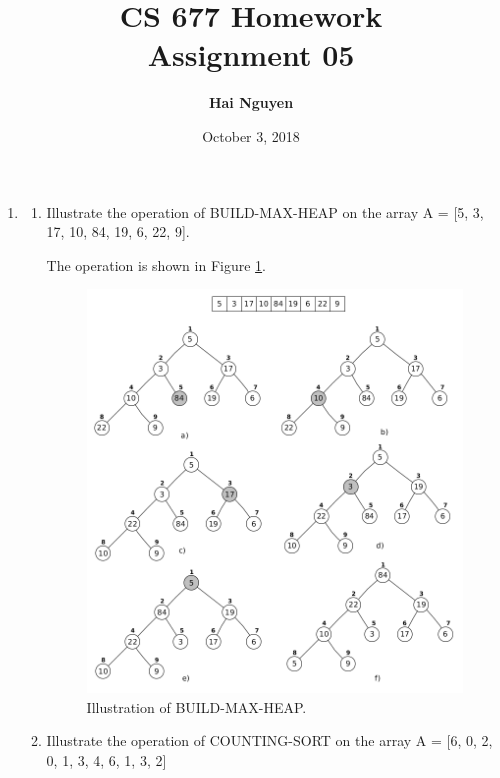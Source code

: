 \documentclass[11pts]{report}
\title{CS 677 Homework \\ Assignment 05}
\date{October 3, 2018}
\author{\textbf{Hai Nguyen}}
\begin{document}
\maketitle

\begin{enumerate}

\item 
\begin{enumerate}
\item Illustrate the operation of BUILD-MAX-HEAP on the array A = [5, 3, 17, 10, 84, 19, 6, 22, 9].

The operation is shown in Figure \ref{Fig:1a}.

\begin{figure}[htbp]
\begin{center}
\includegraphics[scale=0.5]{1a.png}
\caption{Illustration of BUILD-MAX-HEAP.}
\label{Fig:1a}
\end{center}
\end{figure}


\item Illustrate the operation of COUNTING-SORT on the array A = [6, 0, 2, 0, 1, 3, 4, 6, 1, 3, 2]


\end{enumerate}
\end{enumerate}
\end{document}

